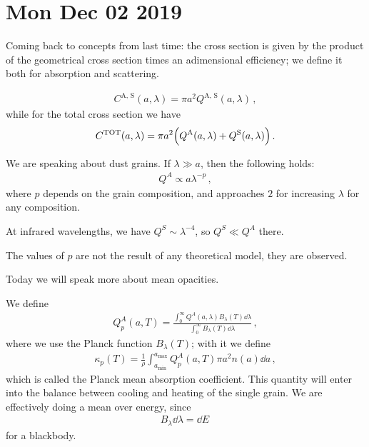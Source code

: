 \documentclass[main.tex]{subfiles}
\begin{document}
\section*{Mon Dec 02 2019}

Coming back to concepts from last time: the cross section is given by the product of the geometrical cross section times an adimensional efficiency; we define it both for absorption and scattering. 

\begin{align}
  C^{\text{A, S}} (a, \lambda )
  = \pi a^2 Q^{\text{A, S}} (a, \lambda )
\,,
\end{align}
%
while for the total cross section we have 
%
\begin{align}
  C^{\text{TOT}} (a, \lambda )
  = \pi a^2 \qty(Q^{\text{A}}(a, \lambda ) + Q^{\text{S}}(a, \lambda ))
\,.
\end{align}

We are speaking about dust grains. 
If \(\lambda \gg a\), then the following holds: 
%
\begin{align}
  Q^{A} \propto a \lambda^{-p}   
\,,
\end{align}
%
where \(p\) depends on the grain composition, and approaches \(2\) for increasing \(\lambda \) for any composition.

At infrared wavelengths, we have \(Q^{S} \sim \lambda^{-4}\), so \(Q^{S}\ll Q^{A}\) there. 


The values of \(p\) are not the result of any theoretical model, they are observed. 

Today we will speak more about mean opacities. 

We define 
%
\begin{align}
  Q^{A}_{p} (a, T) = \frac{\int_{0}^{ \infty } Q^{A} (a, \lambda ) B_{\lambda } (T) \dd{\lambda }}{\int_{0}^{\infty} B_{\lambda } (T) \dd{\lambda }}
\,,
\end{align}
%
where we use the Planck function \(B_{\lambda }(T)\); with it we define 
%
\begin{align}
  \kappa_{p} (T) = \frac{1}{\rho } \int_{a _{\text{min}}}^{a _{\text{max}}} Q^{A}_{p} (a, T) \pi a^2 n(a) \dd{a}
\,,
\end{align}
%
which is called the Planck mean absorption coefficient. 
This quantity will enter into the balance between cooling and heating of the single grain. We are effectively doing a mean over energy, since 
%
\begin{align}
 B_{\lambda } \dd{\lambda } = \dd{E}
\,
\end{align}
%
for a blackbody. 
\end{document}

